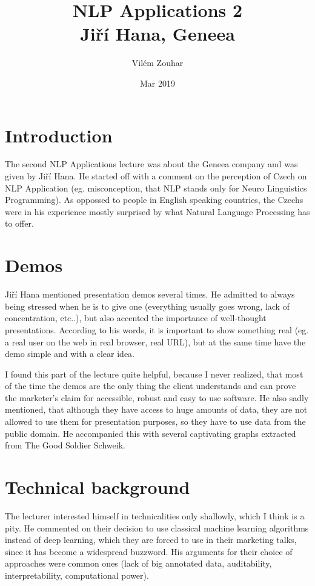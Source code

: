 \documentclass[a4paper]{article}
\begin{document}
\title{NLP Applications 2\\Jiří Hana, Geneea}
\author{Vilém Zouhar}
\date{Mar 2019}

\maketitle 

\vspace{-1cm}

\section*{Introduction}

The second NLP Applications lecture was about the Geneea company and was given by Jiří Hana. He started off with a comment on the perception of Czech on NLP Application (eg. misconception, that NLP stands only for Neuro Linguistics Programming). As oppossed to people in English speaking countries, the Czechs were in his experience mostly surprised by what Natural Language Processing has to offer.

\section*{Demos}
Jiří Hana mentioned presentation demos several times. He admitted to always being stressed when he is to give one (everything usually goes wrong, lack of concentration, etc..), but also accented the importance of well-thought presentations. According to his words, it is important to show something real (eg. a real user on the web in real browser, real URL), but at the same time have the demo simple and with a clear idea.

I found this part of the lecture quite helpful, because I never realized, that most of the time the demos are the only thing the client understands and can prove the marketer's claim for accessible, robust and easy to use software. He also sadly mentioned, that although they have access to huge amounts of data, they are not allowed to use them for presentation purposes, so they have to use data from the public domain. He accompanied this with several captivating graphs extracted from The Good Soldier Schweik.

\section*{Technical background}
The lecturer interested himself in technicalities only shallowly, which I think is a pity. He commented on their decision to use classical machine learning algorithms instead of deep learning, which they are forced to use in their marketing talks, since it has become a widespread buzzword. His arguments for their choice of approaches were common ones (lack of big annotated data, auditability, interpretability, computational power).
\end{document}
